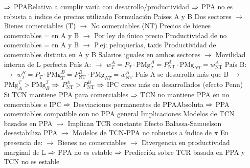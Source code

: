 \documentclass{nuevotema}
\begin{document}
\begin{esquemal}
				\4[] $\Rightarrow$ PPARelativa a cumplir varía con desarrollo/productividad
				\4[] $\Rightarrow$ PPA no es robusta a índice de precios utilizado
				\4 Formulación
				\4[] Países A y B
				\4[] Dos sectores
				\4[] $\to$ Bienes comerciables (T)
				\4[] $\to$ No comerciables (NT)
				\4[] Precios de bienes comerciables = en A y B
				\4[] $\to$ Por ley de único precio
				\4[] Productividad de no comerciables = en A y B
				\4[] $\to$ P.ej: peluquerías, taxis
				\4[] Productividad de comerciables distinta en A y B
				\4[] Salarios iguales en ambos sectores
				\4[] $\to$ Movilidad interna de L perfecta
				\4[] País A:
				\4[] $\to$ $w_T^A = P_T \cdot \text{PMg}_T^A = P_\text{NT}^A \cdot \text{PMg}_{NT} = w_\text{NT}^A$
				\4[] País B:
				\4[] $\to$ $w_T^B = P_T \cdot \text{PMg}_T^B = P_\text{NT}^B \cdot \text{PMg}_{NT} = w_\text{NT}^B$
				\4[] País A se desarrolla más que B
				\4[] $\to$ $\text{PMg}_A^T > \text{PMg}_B^T$ $\Rightarrow$ $P_\text{NT}^A > P_\text{NT}^B$
				\4[] $\Rightarrow$ IPC crece más en desarrollados (efecto Penn)
				\4[] Si TCN mantiene PPA para comerciables
				\4[] $\Rightarrow$ TCN no mantiene PPA en no comerciables e IPC
				\4[] $\Rightarrow$ Desviaciones permanentes de PPAAbsoluta
				\4[] $\Rightarrow$ PPA comerciables compatible con no PPA general
				\4 Implicaciones
				\4[] Modelos de TCN basados en PPA
				\4[] $\to$ Implican TCR constante
				\4[] Efecto Balassa-Samuelson desestabiliza PPA
				\4[] $\to$ Modelos de TCN-PPA no robustos a índice de $\pi$
				\4[] En presencia de:
				\4[] $\to$ Bienes no comerciables
				\4[] $\to$ Divergencia en productividad marginal de L
				\4[] $\Rightarrow$ PPA no es estable
				\4[] $\Rightarrow$ Predicción sobre TCR basada en PPA y TCN no es estable


\end{esquemal}
\end{document}
